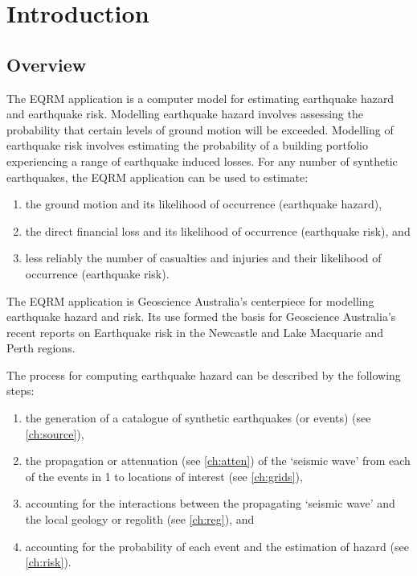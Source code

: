 \chapter{Introduction}
\label{ch:intro}

\section{Overview}

The EQRM application is a computer model for estimating earthquake
hazard and earthquake risk. Modelling earthquake hazard involves
assessing the probability that certain levels of ground motion
will be exceeded. Modelling of earthquake risk involves estimating
the probability of a building portfolio experiencing a range of
earthquake induced losses. For any number of synthetic
earthquakes, the EQRM application can be used to estimate:
\begin{enumerate}
\item the ground motion and its likelihood of occurrence
(earthquake hazard), \item the direct financial loss and its
likelihood of occurrence (earthquake risk), and \item less
reliably the number of casualties and injuries and their
likelihood of occurrence (earthquake risk).
\end{enumerate}

The EQRM application is Geoscience Australia's centerpiece for
modelling earthquake hazard and risk. Its use formed the basis for
Geoscience Australia's recent reports on Earthquake risk in the
Newcastle and Lake Macquarie \citep*{dr_Dhu02a} and Perth
\citep*{dr_Sinadinovski05a} regions.

The process for computing earthquake hazard can be described by
the following steps:
\begin{enumerate}
\item the generation of a catalogue of synthetic earthquakes (or
events) (see \cref{ch:source}), \item the propagation or
attenuation (see \cref{ch:atten}) of the `seismic wave' from each
of the events in 1 to locations of interest (see \cref{ch:grids}),
\item accounting for the interactions between the propagating
`seismic wave' and the local geology or regolith (see
\cref{ch:reg}), and \item accounting for the probability of each
event and the estimation of hazard (see \cref{ch:risk}).
\end{enumerate}

